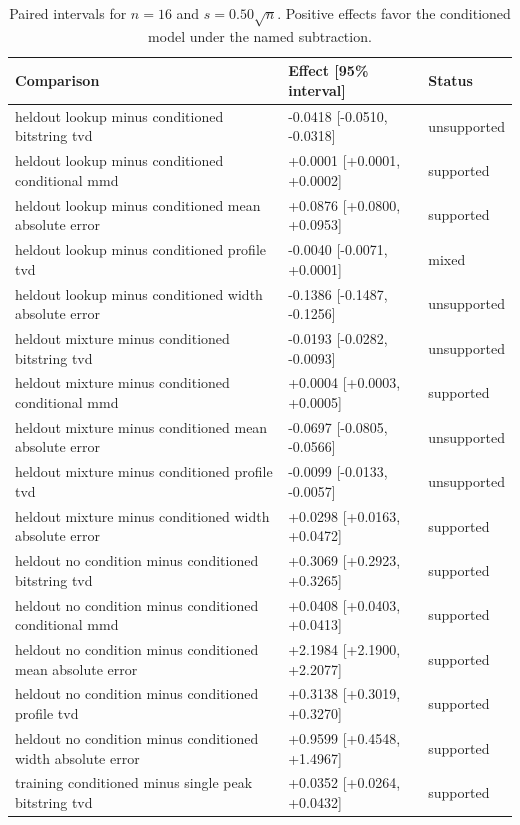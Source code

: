 \begin{table}[p]
\centering
\scriptsize
\setlength{\tabcolsep}{4pt}
\caption{Paired intervals for $n=16$ and $s=0.50\sqrt n$. Positive effects favor the conditioned model under the named subtraction.}
\label{tab:all-intervals-n16-w0.50}
\begin{tabular}{@{}p{}p{}p{}@{}}
\toprule
Comparison & Effect [95\% interval] & Status\\
\midrule
heldout lookup minus conditioned bitstring tvd & -0.0418 [-0.0510, -0.0318] & unsupported \\
heldout lookup minus conditioned conditional mmd & +0.0001 [+0.0001, +0.0002] & supported \\
heldout lookup minus conditioned mean absolute error & +0.0876 [+0.0800, +0.0953] & supported \\
heldout lookup minus conditioned profile tvd & -0.0040 [-0.0071, +0.0001] & mixed \\
heldout lookup minus conditioned width absolute error & -0.1386 [-0.1487, -0.1256] & unsupported \\
heldout mixture minus conditioned bitstring tvd & -0.0193 [-0.0282, -0.0093] & unsupported \\
heldout mixture minus conditioned conditional mmd & +0.0004 [+0.0003, +0.0005] & supported \\
heldout mixture minus conditioned mean absolute error & -0.0697 [-0.0805, -0.0566] & unsupported \\
heldout mixture minus conditioned profile tvd & -0.0099 [-0.0133, -0.0057] & unsupported \\
heldout mixture minus conditioned width absolute error & +0.0298 [+0.0163, +0.0472] & supported \\
heldout no condition minus conditioned bitstring tvd & +0.3069 [+0.2923, +0.3265] & supported \\
heldout no condition minus conditioned conditional mmd & +0.0408 [+0.0403, +0.0413] & supported \\
heldout no condition minus conditioned mean absolute error & +2.1984 [+2.1900, +2.2077] & supported \\
heldout no condition minus conditioned profile tvd & +0.3138 [+0.3019, +0.3270] & supported \\
heldout no condition minus conditioned width absolute error & +0.9599 [+0.4548, +1.4967] & supported \\
training conditioned minus single peak bitstring tvd & +0.0352 [+0.0264, +0.0432] & supported \\

\end{tabular}
\end{table}
